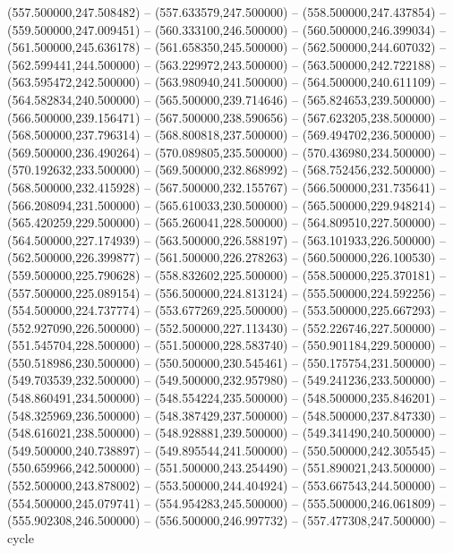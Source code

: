    (557.500000,247.508482) -- (557.633579,247.500000) -- (558.500000,247.437854) -- (559.500000,247.009451) -- (560.333100,246.500000) -- (560.500000,246.399034) -- (561.500000,245.636178) -- (561.658350,245.500000) -- (562.500000,244.607032) -- (562.599441,244.500000) -- (563.229972,243.500000) -- (563.500000,242.722188) -- (563.595472,242.500000) -- (563.980940,241.500000) -- (564.500000,240.611109) -- (564.582834,240.500000) -- (565.500000,239.714646) -- (565.824653,239.500000) -- (566.500000,239.156471) -- (567.500000,238.590656) -- (567.623205,238.500000) -- (568.500000,237.796314) -- (568.800818,237.500000) -- (569.494702,236.500000) -- (569.500000,236.490264) -- (570.089805,235.500000) -- (570.436980,234.500000) -- (570.192632,233.500000) -- (569.500000,232.868992) -- (568.752456,232.500000) -- (568.500000,232.415928) -- (567.500000,232.155767) -- (566.500000,231.735641) -- (566.208094,231.500000) -- (565.610033,230.500000) -- (565.500000,229.948214) -- (565.420259,229.500000) -- (565.260041,228.500000) -- (564.809510,227.500000) -- (564.500000,227.174939) -- (563.500000,226.588197) -- (563.101933,226.500000) -- (562.500000,226.399877) -- (561.500000,226.278263) -- (560.500000,226.100530) -- (559.500000,225.790628) -- (558.832602,225.500000) -- (558.500000,225.370181) -- (557.500000,225.089154) -- (556.500000,224.813124) -- (555.500000,224.592256) -- (554.500000,224.737774) -- (553.677269,225.500000) -- (553.500000,225.667293) -- (552.927090,226.500000) -- (552.500000,227.113430) -- (552.226746,227.500000) -- (551.545704,228.500000) -- (551.500000,228.583740) -- (550.901184,229.500000) -- (550.518986,230.500000) -- (550.500000,230.545461) -- (550.175754,231.500000) -- (549.703539,232.500000) -- (549.500000,232.957980) -- (549.241236,233.500000) -- (548.860491,234.500000) -- (548.554224,235.500000) -- (548.500000,235.846201) -- (548.325969,236.500000) -- (548.387429,237.500000) -- (548.500000,237.847330) -- (548.616021,238.500000) -- (548.928881,239.500000) -- (549.341490,240.500000) -- (549.500000,240.738897) -- (549.895544,241.500000) -- (550.500000,242.305545) -- (550.659966,242.500000) -- (551.500000,243.254490) -- (551.890021,243.500000) -- (552.500000,243.878002) -- (553.500000,244.404924) -- (553.667543,244.500000) -- (554.500000,245.079741) -- (554.954283,245.500000) -- (555.500000,246.061809) -- (555.902308,246.500000) -- (556.500000,246.997732) -- (557.477308,247.500000) -- cycle
